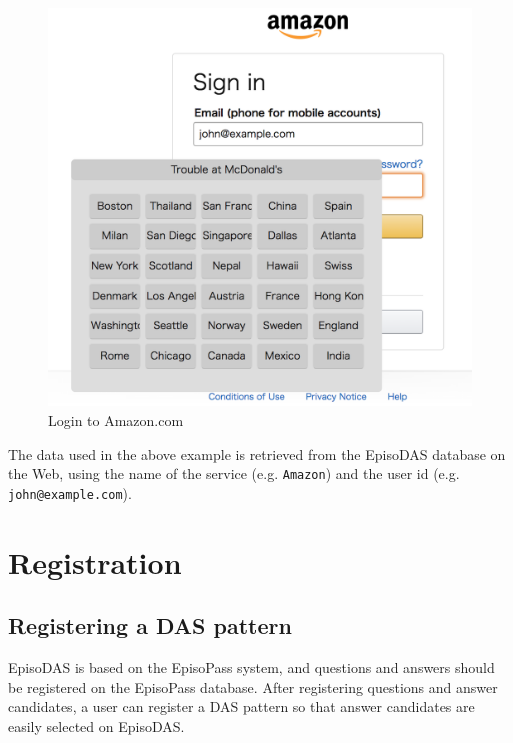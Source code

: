 \documentclass[sigconf]{acmart}
\begin{document}

\begin{figure}[H]
  \includegraphics[width=12cm,bb=0 0 1092 1026]{figures/Amazon.png}
  \caption{Login to Amazon.com}
  \label{Amazon}
\end{figure}

The data used in the above example is retrieved from the EpisoDAS database
on the Web, using the name of the service (e.g. \texttt{Amazon})
and the user id (e.g. \texttt{john@example.com}).

\section{Registration}

\subsection{Registering a DAS pattern}

EpisoDAS is based on the EpisoPass system,
and questions and answers should be registered on the EpisoPass database.
After registering questions and answer candidates,
a user can register a DAS pattern so that
answer candidates are easily selected on EpisoDAS.
\end{document}
